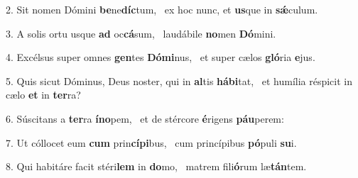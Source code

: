 2. Sit nomen Dómini \textbf{be}ne\textbf{díc}tum, \ast\  ex hoc nunc, et \textbf{us}que in \textbf{sǽ}culum.\

3. A solis ortu usque \textbf{ad} oc\textbf{cá}sum, \ast\  laudábile \textbf{no}men \textbf{Dó}mini.\

4. Excélsus super omnes \textbf{gen}tes \textbf{Dó}\textbf{mi}nus, \ast\  et super cælos \textbf{gló}ria \textbf{e}jus.\

5. Quis sicut Dóminus, Deus noster, qui in \textbf{al}tis \textbf{há}\textbf{bi}tat, \ast\  et humília réspicit in cælo \textbf{et} in \textbf{ter}ra?\

6. Súscitans a \textbf{ter}ra \textbf{ín}\textbf{o}pem, \ast\  et de stércore \textbf{é}rigens \textbf{páu}perem:\

7. Ut cóllocet eum \textbf{cum} prin\textbf{cí}\textbf{pi}bus, \ast\  cum princípibus \textbf{pó}puli \textbf{su}i.\

8. Qui habitáre facit stéri\textbf{lem} in \textbf{do}mo, \ast\  matrem fili\textbf{ó}rum læ\textbf{tán}tem.\


